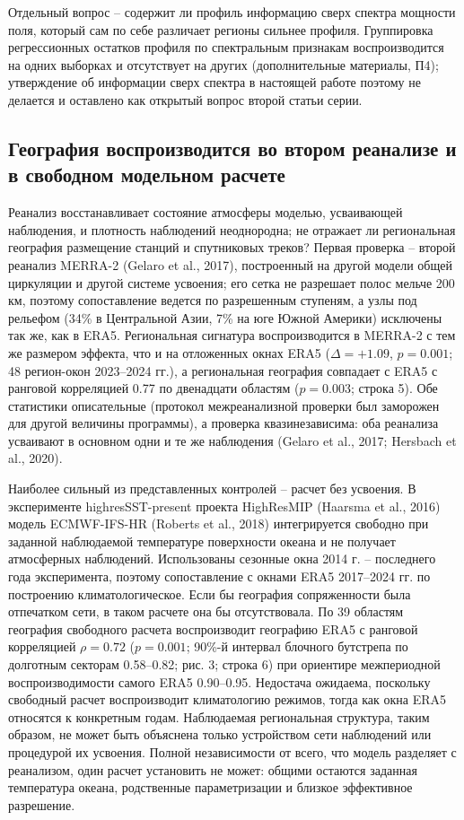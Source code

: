 \documentclass[12pt,a4paper]{article}
\begin{document}
Отдельный вопрос -- содержит ли профиль информацию сверх спектра мощности поля, который сам по себе различает регионы сильнее профиля. Группировка регрессионных остатков профиля по спектральным признакам воспроизводится на одних выборках и отсутствует на других (дополнительные материалы, П4); утверждение об информации сверх спектра в настоящей работе поэтому не делается и оставлено как открытый вопрос второй статьи серии.

\subsection{География воспроизводится во втором реанализе и в свободном модельном расчете}

Реанализ восстанавливает состояние атмосферы моделью, усваивающей наблюдения, и плотность наблюдений неоднородна; не отражает ли региональная география размещение станций и спутниковых треков? Первая проверка -- второй реанализ MERRA-2 (Gelaro et al., 2017), построенный на другой модели общей циркуляции и другой системе усвоения; его сетка не разрешает полос мельче 200 км, поэтому сопоставление ведется по разрешенным ступеням, а узлы под рельефом (34\% в Центральной Азии, 7\% на юге Южной Америки) исключены так же, как в ERA5. Региональная сигнатура воспроизводится в MERRA-2 с тем же размером эффекта, что и на отложенных окнах ERA5 ($\Delta = +1.09$, $p = 0.001$; 48 регион-окон 2023--2024 гг.), а региональная география совпадает с ERA5 с ранговой корреляцией 0.77 по двенадцати областям ($p = 0.003$; строка 5). Обе статистики описательные (протокол межреанализной проверки был заморожен для другой величины программы), а проверка квазинезависима: оба реанализа усваивают в основном одни и те же наблюдения (Gelaro et al., 2017; Hersbach et al., 2020).

Наиболее сильный из представленных контролей -- расчет без усвоения. В эксперименте highresSST-present проекта HighResMIP (Haarsma et al., 2016) модель ECMWF-IFS-HR (Roberts et al., 2018) интегрируется свободно при заданной наблюдаемой температуре поверхности океана и не получает атмосферных наблюдений. Использованы сезонные окна 2014 г. -- последнего года эксперимента, поэтому сопоставление с окнами ERA5 2017--2024 гг. по построению климатологическое. Если бы география сопряженности была отпечатком сети, в таком расчете она бы отсутствовала. По 39 областям география свободного расчета воспроизводит географию ERA5 с ранговой корреляцией $\rho = 0.72$ ($p = 0.001$; 90\%-й интервал блочного бутстрепа по долготным секторам 0.58--0.82; рис. 3; строка 6) при ориентире межпериодной воспроизводимости самого ERA5 0.90--0.95. Недостача ожидаема, поскольку свободный расчет воспроизводит климатологию режимов, тогда как окна ERA5 относятся к конкретным годам. Наблюдаемая региональная структура, таким образом, не может быть объяснена только устройством сети наблюдений или процедурой их усвоения. Полной независимости от всего, что модель разделяет с реанализом, один расчет установить не может: общими остаются заданная температура океана, родственные параметризации и близкое эффективное разрешение.
\end{document}
